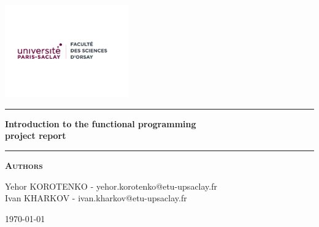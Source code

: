 \begin{titlepage}
\begin{center}
\vspace{2cm}
\includegraphics[width=0.4\textwidth]{saclay_sciences.png}~\\[1cm]
\vspace{2cm}

\hrule
\vspace{.5cm}
{ \huge \bfseries Introduction to the functional programming\\project report} %
\vspace{.5cm}

\hrule
\vspace{1.5cm}

\textsc{\textbf{Authors}}\\
\vspace{.5cm}
\centering

Yehor KOROTENKO - yehor.korotenko@etu-upsaclay.fr\\
Ivan KHARKOV - ivan.kharkov@etu-upsaclay.fr\\

\vspace{4cm}

\centering \today %
\end{center}
\end{titlepage}
